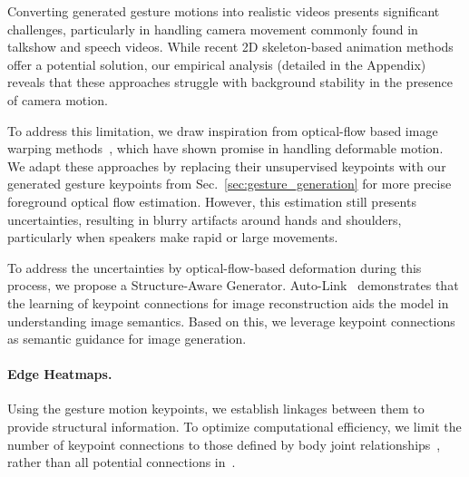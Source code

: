 Converting generated gesture motions into realistic videos presents significant challenges, particularly in handling camera movement commonly found in talkshow and speech videos. While recent 2D skeleton-based animation methods~\cite{hu2023animateanyone} offer a potential solution, our empirical analysis (detailed in the Appendix) reveals that these approaches struggle with background stability in the presence of camera motion.

To address this limitation, we draw inspiration from optical-flow based image warping methods~\cite{zhao2022thin,MRAA, FOMM}, which have shown promise in handling deformable motion. We adapt these approaches by replacing their unsupervised keypoints with our generated gesture keypoints from Sec.~\ref{sec:gesture_generation} for more precise foreground optical flow estimation. However, this estimation still presents uncertainties, resulting in blurry artifacts around hands and shoulders, particularly when speakers make rapid or large movements.

To address the uncertainties by optical-flow-based deformation during this process, we propose a Structure-Aware Generator. Auto-Link~\cite{autolink} demonstrates that the learning of keypoint connections for image reconstruction aids the model in understanding image semantics. Based on this, we leverage keypoint connections as semantic guidance for image generation.



\vspace{-0.2cm}
\paragraph{Edge Heatmaps.}
Using the gesture motion keypoints, we establish linkages between them to provide structural information. To optimize computational efficiency, we limit the number of keypoint connections to those defined by body joint relationships~\cite{wan2017deepskeletonskeletonmap3d}, rather than all potential connections in~\cite{autolink}.

